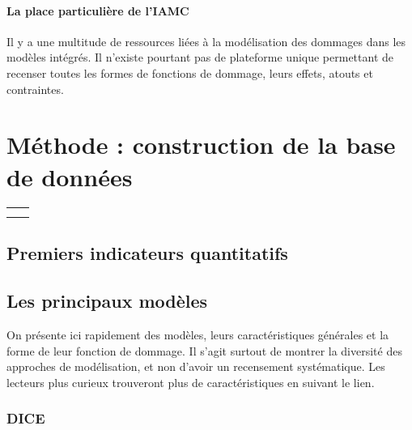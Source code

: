 \paragraph{La place particulière de l'IAMC}


Il y a une multitude de ressources liées à la modélisation des dommages dans les modèles intégrés. Il n'existe pourtant pas de plateforme unique permettant de recenser toutes les formes de fonctions de dommage, leurs effets, atouts et contraintes. 

\section{Méthode : construction de la base de données}

\begin{table}[]
    \centering
    \begin{tabular}{c|c}
         &  \\
         & 
    \end{tabular}
    \label{tab:my_label}
\end{table}

\subsection{Premiers indicateurs quantitatifs}

\begin{figure}
    \centering
    \label{fig:enter-label}
\end{figure}

\subsection{Les principaux modèles}

On présente ici rapidement des modèles, leurs caractéristiques générales et la forme de leur fonction de dommage. Il s'agit surtout de montrer la diversité des approches de modélisation, et non d'avoir un recensement systématique. Les lecteurs plus curieux trouveront plus de caractéristiques en suivant le lien. 

\subsubsection{DICE}

